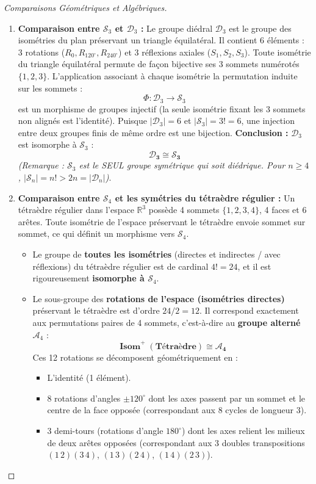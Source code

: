 \documentclass[12pt,a4paper]{report}
\begin{document}
\begin{proof}[Comparaisons Géométriques et Algébriques]
\begin{enumerate}
    \item \textbf{Comparaison entre $\mathcal{S}_3$ et $\mathcal{D}_3$ :}  
    Le groupe diédral $\mathcal{D}_3$ est le groupe des isométries du plan préservant un triangle équilatéral.  
    Il contient 6 éléments : 3 rotations ($R_0, R_{120^\circ}, R_{240^\circ}$) et 3 réflexions axiales ($S_1, S_2, S_3$).  
    Toute isométrie du triangle équilatéral permute de façon bijective ses 3 sommets numérotés $\{1, 2, 3\}$.  
    L'application associant à chaque isométrie la permutation induite sur les sommets :
    \[ \Phi : \mathcal{D}_3 \longrightarrow \mathcal{S}_3 \]
    est un morphisme de groupes injectif (la seule isométrie fixant les 3 sommets non alignés est l'identité).  
    Puisque $|\mathcal{D}_3| = 6$ et $|\mathcal{S}_3| = 3! = 6$, une injection entre deux groupes finis de même ordre est une bijection.  
    \textbf{Conclusion :} $\mathcal{D}_3$ est isomorphe à $\mathcal{S}_3$ :
    \[ \mathbf{\mathcal{D}_3 \cong \mathcal{S}_3} \]
    \textit{(Remarque : $\mathcal{S}_3$ est le SEUL groupe symétrique qui soit diédrique. Pour $n \geq 4$, $|\mathcal{S}_n| = n! > 2n = |\mathcal{D}_n|$)}.

    \item \textbf{Comparaison entre $\mathcal{S}_4$ et les symétries du tétraèdre régulier :}  
    Un tétraèdre régulier dans l'espace $\mathbb{R}^3$ possède 4 sommets $\{1, 2, 3, 4\}$, 4 faces et 6 arêtes.  
    Toute isométrie de l'espace préservant le tétraèdre envoie sommet sur sommet, ce qui définit un morphisme vers $\mathcal{S}_4$.  
    \begin{itemize}
        \item Le groupe de \textbf{toutes les isométries} (directes et indirectes / avec réflexions) du tétraèdre régulier est de cardinal $4! = 24$, et il est rigoureusement \textbf{isomorphe à $\mathcal{S}_4$}.
        \item Le sous-groupe des \textbf{rotations de l'espace (isométries directes)} préservant le tétraèdre est d'ordre $24 / 2 = 12$. Il correspond exactement aux permutations paires de 4 sommets, c'est-à-dire au \textbf{groupe alterné $\mathcal{A}_4$} :
        \[ \mathbf{\operatorname{Isom}^+(\text{Tétraèdre}) \cong \mathcal{A}_4} \]
        Ces 12 rotations se décomposent géométriquement en :
        \begin{itemize}
            \item L'identité (1 élément).
            \item 8 rotations d'angles $\pm 120^\circ$ dont les axes passent par un sommet et le centre de la face opposée (correspondant aux 8 cycles de longueur 3).
            \item 3 demi-tours (rotations d'angle $180^\circ$) dont les axes relient les milieux de deux arêtes opposées (correspondant aux 3 doubles transpositions $(1\,2)(3\,4)$, $(1\,3)(2\,4)$, $(1\,4)(2\,3)$).
        \end{itemize}
    \end{itemize}
\end{enumerate}
\end{proof}
\end{document}
